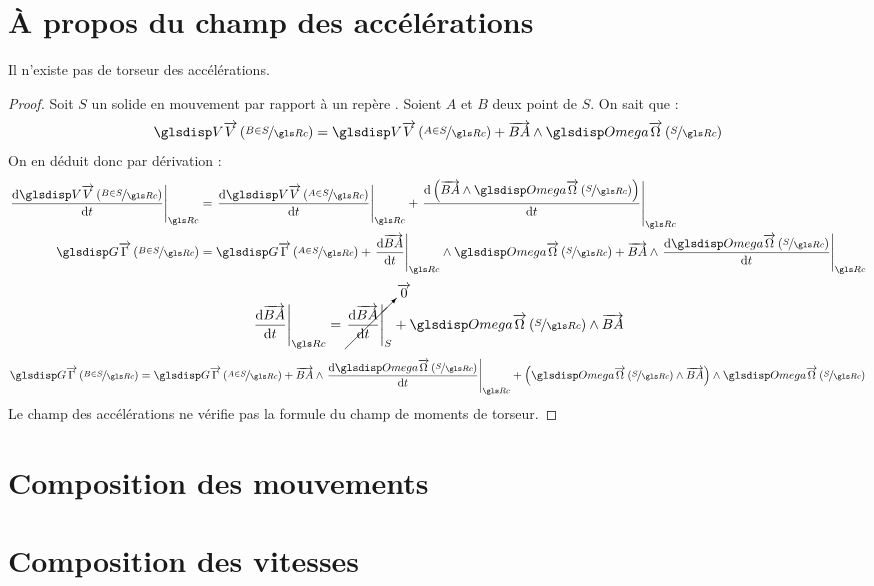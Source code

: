 	\section{\`A propos du champ des accélérations}
	\begin{theorem}
		Il n'existe pas de torseur des accélérations.
	\end{theorem}
	\begin{proof}
		Soit $S$ un solide en mouvement par rapport à un repère \Rc. Soient $A$ et $B$ deux point de $S$.
		On sait que :
		\begin{equation*}
			\V{B}{S}=\V{A}{S}+\vect{BA}\wedge\Om{S}
		\end{equation*}
		On en déduit donc par dérivation :
		\begin{align*}
			\diff[\Rc]{\V{B}{S}}&=\diff[\Rc]{\V{A}{S}}+\diff[\Rc]{\left(\vect{BA}\wedge\Om{S}\right)}\\
			\G{B}{S}			& =\G{A}{S}+\diff[\Rc]{\vect{BA}}\wedge\Om{S}+\vect{BA}\wedge\diff[\Rc]{\Om{S}}
		\end{align*}
		\begin{equation*}
			\diff[\Rc]{\vect{BA}}=\cancelto{\vect{0}}{\diff[S]{\vect{BA}}}+\Om{S}\wedge\vect{BA}
		\end{equation*}
		\begin{equation}
			\G{B}{S}=\G{A}{S}+\vect{BA}\wedge\diff[\Rc]{\Om{S}}+\left(\Om{S}\wedge\vect{BA}\right)\wedge\Om{S}
			\label{eq:composition-accelerations}
		\end{equation}
		Le champ des accélérations ne vérifie pas la formule du champ de moments de torseur.
	\end{proof}
	
	
\section{Composition des mouvements}
	\section{Composition des vitesses}
	\label{sec:compo-vitesse}
	\begin{theorem}
	\end{theorem}
	
